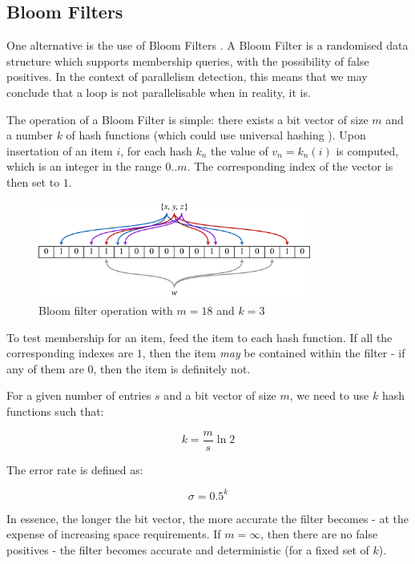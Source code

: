 		\subsection{Bloom Filters} \label{sec:runtime/storage/probabilistic/bloom}
		One alternative is the use of Bloom Filters \citep{Bloom1970}. A Bloom Filter is a randomised data structure which supports membership queries, with the possibility of false positives. In the context of parallelism detection, this means that we may conclude that a loop is not parallelisable when in reality, it is.
		
		The operation of a Bloom Filter is simple: there exists a bit vector of size $m$ and a number $k$ of hash functions (which could use universal hashing \citep{Carter1979}). Upon insertation of an item $i$, for each hash $k_n$ the value of $v_n=k_n(i)$ is computed, which is an integer in the range $0..m$. The corresponding index of the vector is then set to $1$.
		
		\begin{figure}[h!]
				\centering
				\includegraphics[width=0.8\textwidth]{graphics/bloomfilter.pdf}
				\caption{Bloom filter operation with $m=18$ and $k=3$}
				\label{fig:bloom-filter}
		\end{figure}
			
		To test membership for an item, feed the item to each hash function. If all the corresponding indexes are $1$, then the item \emph{may} be contained within the filter - if any of them are $0$, then the item is definitely not.
		
		For a given number of entries $s$ and a bit vector of size $m$, we need to use $k$ hash functions such that:
		
		\[
		k = \frac{m}{s} \ln 2
		\]
		
		The error rate is defined as:
		
		\[
		\sigma = 0.5^k
		\]
		
		In essence, the longer the bit vector, the more accurate the filter becomes - at the expense of increasing space requirements. If $m=\infty$, then there are no false positives - the filter becomes accurate and deterministic (for a fixed set of $k$).
		
